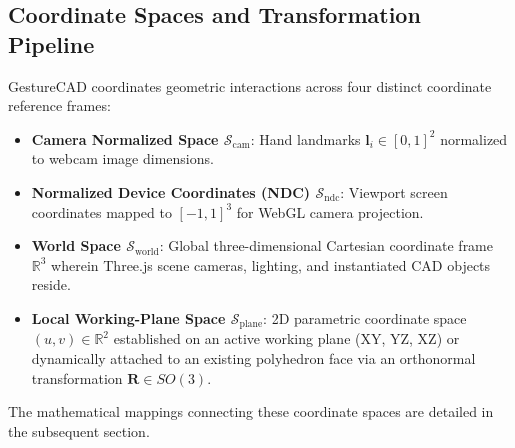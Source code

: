 \subsection{Coordinate Spaces and Transformation Pipeline}
GestureCAD coordinates geometric interactions across four distinct coordinate reference frames:
\begin{itemize}
    \item \textbf{Camera Normalized Space $\mathcal{S}_{\text{cam}}$}: Hand landmarks $\mathbf{l}_i \in [0, 1]^2$ normalized to webcam image dimensions.
    \item \textbf{Normalized Device Coordinates (NDC) $\mathcal{S}_{\text{ndc}}$}: Viewport screen coordinates mapped to $[-1, 1]^3$ for WebGL camera projection.
    \item \textbf{World Space $\mathcal{S}_{\text{world}}$}: Global three-dimensional Cartesian coordinate frame $\mathbb{R}^3$ wherein Three.js scene cameras, lighting, and instantiated CAD objects reside.
    \item \textbf{Local Working-Plane Space $\mathcal{S}_{\text{plane}}$}: 2D parametric coordinate space $(u, v) \in \mathbb{R}^2$ established on an active working plane (XY, YZ, XZ) or dynamically attached to an existing polyhedron face via an orthonormal transformation $\mathbf{R} \in SO(3)$.
\end{itemize}
The mathematical mappings connecting these coordinate spaces are detailed in the subsequent section.
